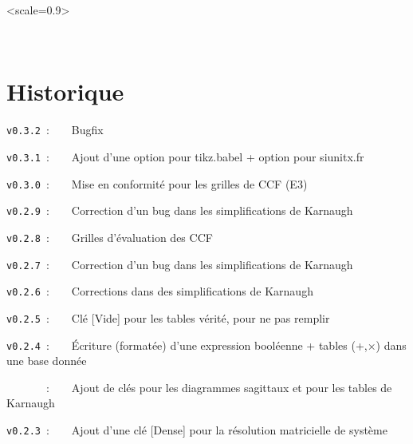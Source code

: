 \documentclass[french,a4paper,11pt]{article}
\providecommand\tikzlogo{Ti\textit{k}Z}
\providecommand\TeXLive{\TeX{}Live\xspace}
\let\TikZ\tikzlogo
\newcommand\TableauDocumentation{%
	\begin{tblr}{width=\linewidth,colspec={X[c]X[c]X[c]X[c]X[c]X[c]},cells={font=\large\sffamily}}
		{\LaTeX} & {\hologo{pdfLaTeX}} & {\hologo{LuaLaTeX}} & {\TikZ} & {\TeXLive} & {\hologo{MiKTeX}} \\
	\end{tblr}
}
\begin{document}
{{\vspace{0.5cm}

\hfill
\begin{GrapheTikz}[Unite=0.75cm,CouleurSommets={gray/blue},Epaisseur={very thick/thick},CouleurFleches=orange]<scale=0.9>
\end{GrapheTikz}
\hfill~
\hfill~


%
%
%
%
%

\newpage

\hypertarget{matoc}{}

\tableofcontents

\vfill

\newpage

\section{Historique}

\verb|v0.3.2|~:~~~~Bugfix

\verb|v0.3.1|~:~~~~Ajout d'une option pour tikz.babel + option pour siunitx.fr

\verb|v0.3.0|~:~~~~Mise en conformité pour les grilles de CCF (E3)

\verb|v0.2.9|~:~~~~Correction d'un bug dans les simplifications de Karnaugh

\verb|v0.2.8|~:~~~~Grilles d'évaluation des CCF

\verb|v0.2.7|~:~~~~Correction d'un bug dans les simplifications de Karnaugh

\verb|v0.2.6|~:~~~~Corrections dans des simplifications de Karnaugh

\verb|v0.2.5|~:~~~~Clé \textsf{[Vide]} pour les tables vérité, pour ne pas remplir

\verb|v0.2.4|~:~~~~Écriture (formatée) d'une expression booléenne + tables (+,×) dans une base donnée

\verb|      |~:~~~~Ajout de clés pour les diagrammes sagittaux et pour les tables de Karnaugh

\verb|v0.2.3|~:~~~~Ajout d'une clé [Dense] pour la résolution matricielle de système

}}
\end{document}
